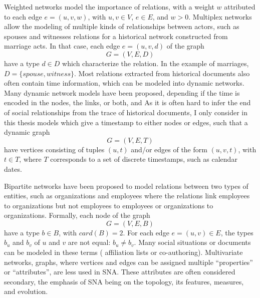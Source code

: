 Weighted networks model the importance of relations, with a weight $w$ attributed to each edge $e = (u, v, w)$, with $u, v \in V$, $e \in E$, and $w > 0$.
Multiplex networks allow the modeling of multiple kinds of relationships between actors, such as spouses and witnesses relations for a historical network constructed from marriage acts.
In that case, each edge $e = (u, v, d)$ of the graph
\begin{equation}
    G = (V, E, D)
\end{equation}
have a type $d \in D$ which characterize the relation. In the example of marriages, $D = \{spouse, witness\}$.
Most relations extracted from historical documents also often contain time information, which can be modeled into dynamic networks.
Many dynamic network models have been proposed\cite{rossettiCommunityDiscoveryDynamic2018}, depending if the time is encoded in the nodes, the links, or both, and 
As it is often hard to infer the end of social relationships from the trace of historical documents, I only consider in this thesis models which give a timestamp to either nodes or edges, such that a dynamic graph
\begin{equation}
    G = (V, E, T)
\end{equation}
have vertices consisting of tuples $(u, t)$ and/or edges of the form $(u, v, t)$, with $t \in T$, where $T$ corresponds to a set of discrete timestamps, such as calendar dates.

Bipartite networks have been proposed to model relations between two types of entities, such as organizations and employees where the relations link employees to organizations but not employees to employees or organizations to organizations\cite{borgattiSocialNetworkAnalysis2009}.
Formally, each node of the graph
\begin{equation}
    G = (V, E, B)
\end{equation}
have a type $b \in B$, with $card(B) = 2$. For each edge $e = (u, v) \in E$, the types $b_u$ and $b_v$ of $u$ and $v$ are not equal: $b_u \neq b_v$.
Many social situations or documents can be modeled in these terms (%
affiliation lists or co-authoring).
Multivariate networks, \ie graphs, where vertices and edges can be assigned multiple ``properties'' or ``attributes'', are less used in SNA\@.
These attributes are often considered secondary, the emphasis of SNA being on the topology, its features, measures, and evolution.

